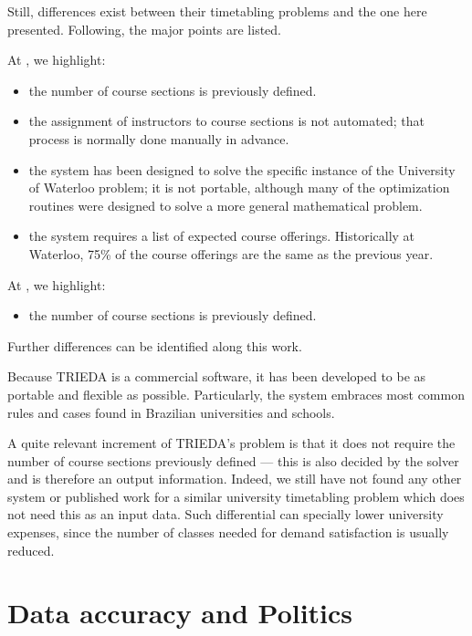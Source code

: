 Still, differences exist between their timetabling problems and the one here presented. Following, the major points are listed.

At \cite{Carter2001}, we highlight:
\begin{itemize}
\item the number of course sections is previously defined.
\item the assignment of instructors to course sections is not automated; that process is normally done manually in advance. 
\item the system has been designed to solve the specific instance of the University of Waterloo problem; it is not portable, although many of the optimization routines were designed to solve a more general mathematical problem.
\item the system requires a list of expected course offerings. Historically at Waterloo, 75\% of the course offerings are the same as the previous year.
\end{itemize}

At \cite{Murray2007}, we highlight:
\begin{itemize}
\item the number of course sections is previously defined.
\end{itemize}

Further differences can be identified along this work.

Because TRIEDA is a commercial software, it has been developed to be as portable and flexible as possible. Particularly, the system embraces most common rules and cases found in Brazilian universities and schools.

A quite relevant increment of TRIEDA's problem is that it does not require the number of course sections previously defined --- this is also decided by the solver and is therefore an output information. Indeed, we still have not found any other system or published work for a similar university timetabling problem which does not need this as an input data. Such differential can specially lower university expenses, since the number of classes needed for demand satisfaction is usually reduced.


\section{Data accuracy and Politics}

